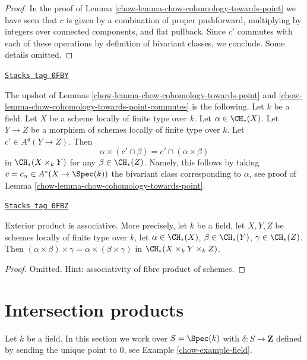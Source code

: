 \begin{proof}

In the proof of Lemma \ref{chow-lemma-chow-cohomology-towards-point}
we have seen that $c$ is given by a combination of
proper pushforward, multiplying by integers over connected
components, and flat pullback. Since $c'$ commutes with each of
these operations by definition of bivariant classes, we conclude.
Some details omitted.
\end{proof}

\begin{remark}
\label{chow-remark-commuting-exterior}
\href{https://stacks.math.columbia.edu/tag/0FBY}{\texttt{Stacks tag 0FBY}}

The upshot of Lemmas \ref{chow-lemma-chow-cohomology-towards-point}
and \ref{chow-lemma-chow-cohomology-towards-point-commutes} is the following.
Let $k$ be a field. Let $X$ be a scheme locally of finite type over $k$.
Let $\alpha \in \CH_*(X)$. Let $Y \to Z$ be a morphism of schemes
locally of finite type over $k$. Let $c' \in A^q(Y \to Z)$. Then
$$
\alpha \times (c' \cap \beta) = c' \cap (\alpha \times \beta)
$$
in $\CH_*(X \times_k Y)$ for any $\beta \in \CH_*(Z)$. Namely, this
follows by taking $c = c_\alpha \in A^*(X \to \Spec(k))$ the bivariant class
corresponding to $\alpha$, see proof of
Lemma \ref{chow-lemma-chow-cohomology-towards-point}.
\end{remark}

\begin{lemma}
\label{chow-lemma-exterior-product-associative}
\href{https://stacks.math.columbia.edu/tag/0FBZ}{\texttt{Stacks tag 0FBZ}}

Exterior product is associative. More precisely, let $k$ be a field,
let $X, Y, Z$ be schemes locally of finite type over $k$, let
$\alpha \in \CH_*(X)$, $\beta \in \CH_*(Y)$, $\gamma \in \CH_*(Z)$.
Then $(\alpha \times \beta) \times \gamma =
\alpha \times (\beta \times \gamma)$ in $\CH_*(X \times_k Y \times_k Z)$.
\end{lemma}

\begin{proof}
Omitted. Hint: associativity of fibre product of schemes.
\end{proof}

\section{Intersection products}
\label{chow-section-intersection-product}
Let $k$ be a field. In this section we work over $S = \Spec(k)$ with
$\delta : S \to \mathbf{Z}$ defined by sending the unique point to $0$, see
Example \ref{chow-example-field}.

